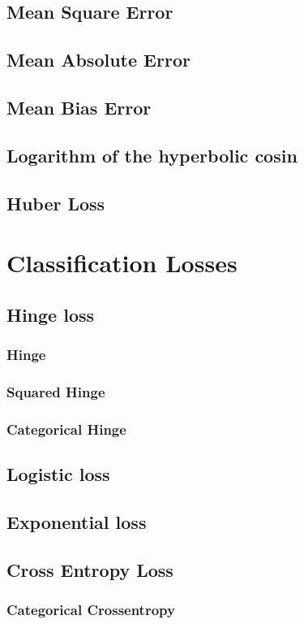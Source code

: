 \documentclass[oneside]{book}
\begin{document}
			\subsection{Mean Square Error}
			\subsection{Mean Absolute Error}
			\subsection{Mean Bias Error}
			\subsection{Logarithm of the hyperbolic cosin}
			\subsection{Huber Loss}
		\section{Classification Losses}
			\subsection{Hinge loss}
				\subsubsection{Hinge}
				\subsubsection{Squared Hinge}
				\subsubsection{Categorical Hinge}
			\subsection{Logistic loss}
			\subsection{Exponential loss}
			\subsection{Cross Entropy Loss}
				\subsubsection{Categorical Crossentropy}
\end{document}
